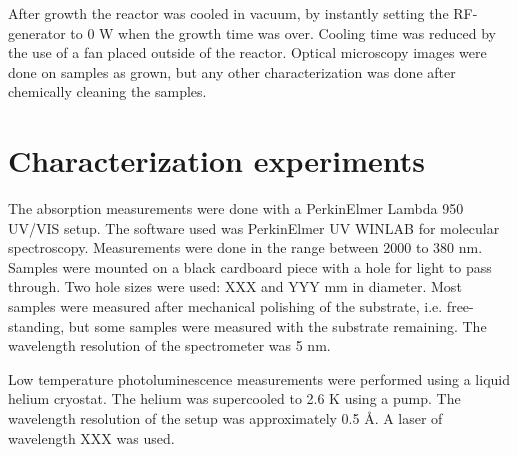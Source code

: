 After growth the reactor was cooled in vacuum, by instantly setting the RF-generator to 0 W when the growth time was over. Cooling time was reduced by the use of a fan placed outside of the reactor. Optical microscopy images were done on samples as grown, but any other characterization was done after chemically cleaning the samples. 

\section{Characterization experiments}
\label{sec:experimental:characterization}
The absorption measurements were done with a PerkinElmer Lambda 950 UV/VIS setup. The software used was PerkinElmer UV WINLAB for molecular spectroscopy. Measurements were done in the range between 2000 to 380 nm. Samples were mounted on a black cardboard piece with a hole for light to pass through. Two hole sizes were used: XXX and YYY mm in diameter. Most samples were measured after mechanical polishing of the substrate, i.e. free-standing, but some samples were measured with the substrate remaining. The wavelength resolution of the spectrometer was 5 nm. 

Low temperature photoluminescence measurements were performed using a liquid helium cryostat. The helium was supercooled to 2.6 K using a pump. The wavelength resolution of the setup was approximately 0.5 Å. A laser of wavelength XXX was used. 








































